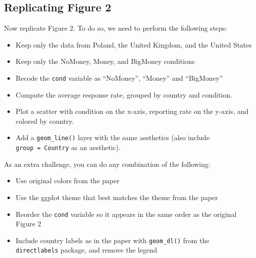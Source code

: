 \documentclass[12pt,halfline,a4paper,]{ouparticle}
\providecommand{\tightlist}{%
  \setlength{\itemsep}{0pt}\setlength{\parskip}{0pt}}
\begin{document}
\hypertarget{replicating-figure-2}{%
\subsection{Replicating Figure 2}\label{replicating-figure-2}}

Now replicate Figure 2. To do so, we need to perform the following
steps:

\begin{itemize}
\tightlist
\item
  Keep only the data from Poland, the United Kingdom, and the United
  States
\item
  Keep only the NoMoney, Money, and BigMoney conditions
\item
  Recode the \texttt{cond} variable as ``NoMoney'', ``Money'' and
  ``BigMoney''
\item
  Compute the average response rate, grouped by country and condition.
\item
  Plot a scatter with condition on the x-axis, reporting rate on the
  y-axis, and colored by country.
\item
  Add a \texttt{geom\_line()} layer with the same aesthetics (also
  include \texttt{group\ =\ Country} as an aesthetic).
\end{itemize}

\noindent As an extra challenge, you can do any combination of the
following:

\begin{itemize}
\tightlist
\item
  Use original colors from the paper
\item
  Use the ggplot theme that best matches the theme from the paper
\item
  Reorder the \texttt{cond} variable so it appears in the same order as
  the original Figure 2
\item
  Include country labels as in the paper with \texttt{geom\_dl()} from
  the \texttt{directlabels} package, and remove the legend
\end{itemize}
\end{document}
